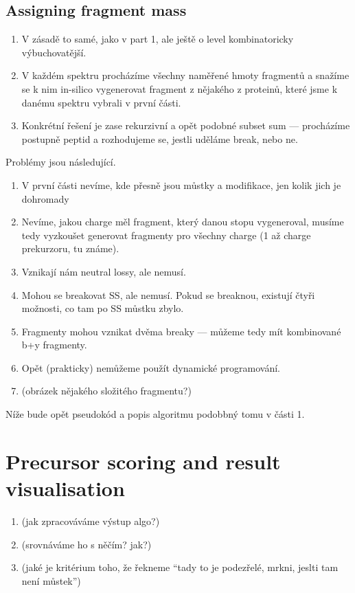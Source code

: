 \subsection{Assigning fragment mass}

\begin{enumerate}
	\item V zásadě to samé, jako v part 1, ale ještě o level kombinatoricky výbuchovatější.
	\item V každém spektru procházíme všechny naměřené hmoty fragmentů a snažíme se k nim in-silico vygenerovat fragment z nějakého z proteinů, které jsme k danému spektru vybrali v první části.
	\item Konkrétní řešení je zase rekurzivní a opět podobné subset sum — procházíme postupně peptid a rozhodujeme se, jestli uděláme break, nebo ne.
\end{enumerate}

Problémy jsou následující.

\begin{enumerate}
	\item V první části nevíme, kde přesně jsou můstky a modifikace, jen kolik jich je dohromady
	\item Nevíme, jakou charge měl fragment, který danou stopu vygeneroval, musíme tedy vyzkoušet generovat fragmenty pro všechny charge (1 až charge prekurzoru, tu známe).
	\item Vznikají nám neutral lossy, ale nemusí.
	\item Mohou se breakovat SS, ale nemusí. Pokud se breaknou, existují čtyři možnosti, co tam po SS můstku zbylo.
	\item Fragmenty mohou vznikat dvěma breaky — můžeme tedy mít kombinované b+y fragmenty.
	\item Opět (prakticky) nemůžeme použít dynamické programování.
	\item (obrázek nějakého složitého fragmentu?)
\end{enumerate}

Níže bude opět pseudokód a popis algoritmu podobbný tomu v části 1.

\section{Precursor scoring and result visualisation}

\begin{enumerate}
	\item (jak zpracováváme výstup algo?)
	\item (srovnáváme ho s něčím? jak?)
	\item (jaké je kritérium toho, že řekneme ``tady to je podezřelé, mrkni, jeslti tam není můstek'')
\end{enumerate}


